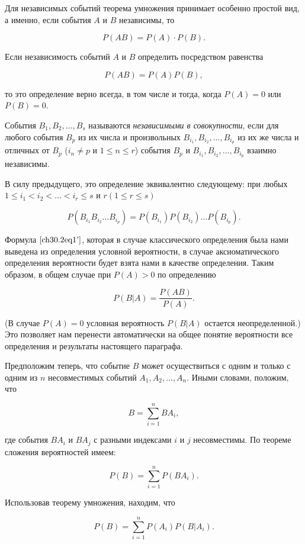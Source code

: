 Для независимых событий теорема умножения принимает особенно простой вид, а именно, если события $A$ и $B$ независимы, то

$$
P(AB) = P(A) \cdot P(B).
$$

Если независимость событий $A$ и $B$ определить посредством равенства

$$
P(AB) = P(A)P(B),
$$

то это определение верно всегда, в том числе и тогда, когда $P(A) = 0$ или $P(B) = 0$.

События $B_1,B_2, \ldots, B_s$ называются \textit{независимыми в совокупности}, если для любого события $B_p$ из их числа и произвольных $B_{i_1}, B_{i_2}, \ldots, B_{i_p}$ из их же числа и отличных от $B_p$  ($i_n \not= p$  и $1 \le n \le r$) события $B_p$ и $B_{i_1}, B_{i_2}, \ldots, B_{i_p}$ взаимно независимы.

В силу предыдущего, это определение эквивалентно следующему: при любых $1 \le i_1 < i_2 < \ldots < i_r \le s$ и $r(1 \le r \le s)$

$$
P(B_{i_1}B_{i_2}\ldots B_{i_p}) = P(B_{i_1})P(B_{i_2}) \ldots P(B_{i_p}).
$$

Формула $\eqref{ch30.2eq1'}$, которая в случае классического определения была нами выведена из определения условной вероятности, в случае аксиоматического определения вероятности будет взята нами в качестве определения. Таким образом, в общем случае при $P(A) > 0$ по определению

$$
P(B|A) = \frac{P(AB)}{P(A)}.
$$

(В случае $P(A) = 0$ условная вероятность $P(B|A)$ остается неопределенной.) Это позволяет нам перенести автоматически на общее понятие вероятности все определения и результаты настоящего параграфа.

Предположим теперь, что событие $B$ может осуществиться с одним и только с одним из $n$ несовместимых событий $A_1,A_2, \ldots, A_n$. Иными словами, положим, что

\begin{equation} \label{ch30.2eq5}
B = \sum\limits_{i = 1}^{n} B A_i,
\end{equation}

где события $BA_i$ и $BA_j$ с разными индексами $i$ и $j$ несовместимы. По теореме сложения вероятностей имеем:

$$
P(B) = \sum_{i = 1}^{n} P(BA_i).
$$

Использовав теорему умножения, находим, что

$$
P(B) = \sum_{i = 1}^{n} P(A_i)P(B|A_i).
$$

